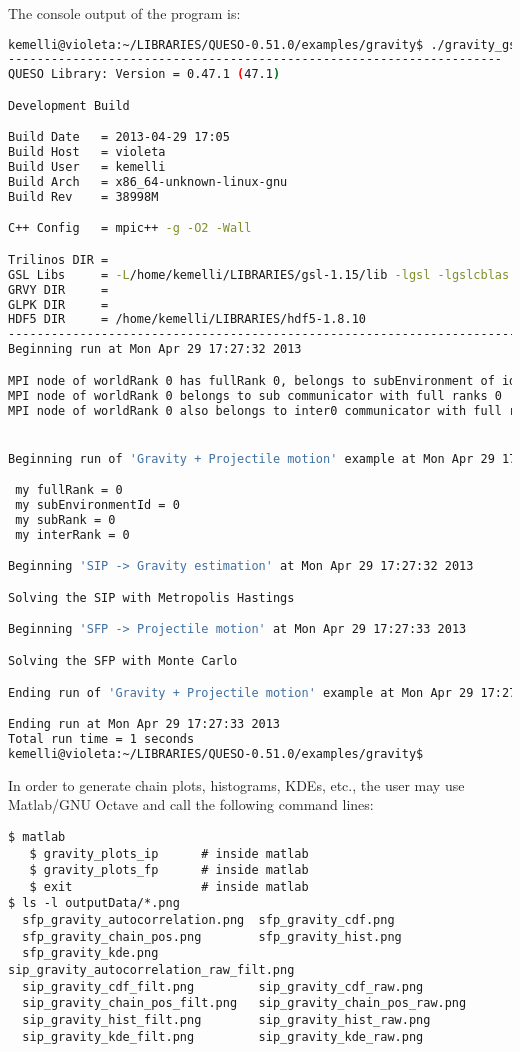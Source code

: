 The console output of the program is:
\begin{lstlisting}[caption={Console output of program \texttt{gravity\_gsl}}, label={code:console_output},language={bash}]
kemelli@violeta:~/LIBRARIES/QUESO-0.51.0/examples/gravity$ ./gravity_gsl gravity_inv_fwd.inp 
---------------------------------------------------------------------
QUESO Library: Version = 0.47.1 (47.1)

Development Build

Build Date   = 2013-04-29 17:05
Build Host   = violeta
Build User   = kemelli
Build Arch   = x86_64-unknown-linux-gnu
Build Rev    = 38998M

C++ Config   = mpic++ -g -O2 -Wall

Trilinos DIR = 
GSL Libs     = -L/home/kemelli/LIBRARIES/gsl-1.15/lib -lgsl -lgslcblas -lm
GRVY DIR     = 
GLPK DIR     = 
HDF5 DIR     = /home/kemelli/LIBRARIES/hdf5-1.8.10
--------------------------------------------------------------------------------------------------------------
Beginning run at Mon Apr 29 17:27:32 2013

MPI node of worldRank 0 has fullRank 0, belongs to subEnvironment of id 0, and has subRank 0
MPI node of worldRank 0 belongs to sub communicator with full ranks 0
MPI node of worldRank 0 also belongs to inter0 communicator with full ranks 0, and has inter0Rank 0


Beginning run of 'Gravity + Projectile motion' example at Mon Apr 29 17:27:32 2013

 my fullRank = 0
 my subEnvironmentId = 0
 my subRank = 0
 my interRank = 0

Beginning 'SIP -> Gravity estimation' at Mon Apr 29 17:27:32 2013

Solving the SIP with Metropolis Hastings

Beginning 'SFP -> Projectile motion' at Mon Apr 29 17:27:33 2013

Solving the SFP with Monte Carlo

Ending run of 'Gravity + Projectile motion' example at Mon Apr 29 17:27:33 2013

Ending run at Mon Apr 29 17:27:33 2013
Total run time = 1 seconds
kemelli@violeta:~/LIBRARIES/QUESO-0.51.0/examples/gravity$ 
\end{lstlisting}


In order to generate chain plots, histograms, KDEs, etc., the user may use Matlab/GNU Octave and call 
the following command lines:
\begin{lstlisting}
$ matlab
   $ gravity_plots_ip      # inside matlab
   $ gravity_plots_fp      # inside matlab
   $ exit                  # inside matlab
$ ls -l outputData/*.png
  sfp_gravity_autocorrelation.png  sfp_gravity_cdf.png
  sfp_gravity_chain_pos.png        sfp_gravity_hist.png
  sfp_gravity_kde.png              sip_gravity_autocorrelation_raw_filt.png
  sip_gravity_cdf_filt.png         sip_gravity_cdf_raw.png
  sip_gravity_chain_pos_filt.png   sip_gravity_chain_pos_raw.png
  sip_gravity_hist_filt.png        sip_gravity_hist_raw.png
  sip_gravity_kde_filt.png         sip_gravity_kde_raw.png
\end{lstlisting}

